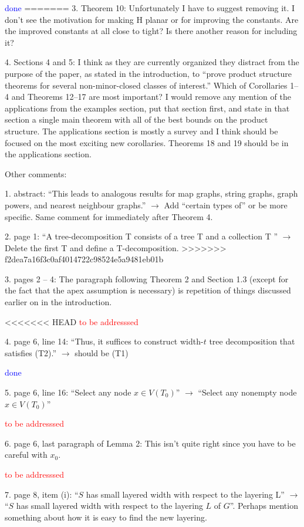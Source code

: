 \documentclass[12pt]{article}
\newcommand{\done}{\textcolor{blue}{done}}
\newcommand{\tba}{\textcolor{red}{to be addresssed}}
\begin{document}
\done
=======
3. Theorem 10: Unfortunately I have to suggest removing it. I don’t see
the motivation for making H planar or for improving the constants.
Are the improved constants at all close to tight? Is there another
reason for including it?

4. Sections 4 and 5: I think as they are currently organized they distract from the purpose of the paper, as stated in the introduction, to
“prove product structure theorems for several non-minor-closed classes
of interest.” Which of Corollaries 1–4 and Theorems 12–17 are most
important? I would remove any mention of the applications from the
examples section, put that section first, and state in that section a single main theorem with all of the best bounds on the product structure.
The applications section is mostly a survey and I think should be
focused on the most exciting new corollaries. Theorems 18 and 19
should be in the applications section.

Other comments:

1. abstract: “This leads to analogous results for map graphs, string graphs, graph powers, and nearest neighbour graphs.” $\longrightarrow$ Add “certain types of” or be more specific. Same comment for immediately after Theorem 4.

2. page 1: “A tree-decomposition T consists of a tree T and a collection
T ” $\longrightarrow$ Delete the first T and define a T-decomposition.
>>>>>>> f2dea7a16f3c0af4014722c98524e5a9481eb01b

3. pages 2 – 4: The paragraph following Theorem 2 and Section 1.3
(except for the fact that the apex assumption is necessary) is repetition
of things discussed earlier on in the introduction.

<<<<<<< HEAD
\tba

4. page 6, line 14: ``Thus, it suffices to construct width-$t$ tree decomposition that satisfies (T2).'' $\longrightarrow$ should be (T1)

\done

5. page 6, line 16: ``Select any node $x \in V (T_0)$'' $\longrightarrow$ ``Select any nonempty node $x \in V (T_0)$''

\tba

6. page 6, last paragraph of Lemma 2: This isn’t quite right since you
have to be careful with $x_0$.

\tba

7. page 8, item (i): ``$S$ has small layered width with respect to the layering
L'' $\longrightarrow$ ``$S$ has small layered width with respect to the layering $L$ of
$G$''. Perhaps mention something about how it is easy to find the new layering.
\end{document}
